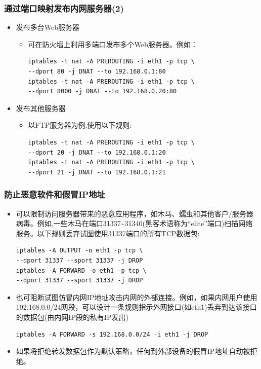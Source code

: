 \documentclass[xcolor=svgnames,presentation]{beamer}
\begin{document}
\begin{frame}[fragile]
\frametitle{通过端口映射发布内网服务器(2)}
\label{sec-3-9}
\begin{itemize}

\item 发布多台Web服务器
\label{sec-3-9-1}%
\begin{itemize}

\item 可在防火墙上利用多端口发布多个Web服务器。例如：\\
\label{sec-3-9-1-1}%
\begin{verbatim}
iptables -t nat -A PREROUTING -i eth1 -p tcp \
--dport 80 -j DNAT --to 192.168.0.1:80
iptables -t nat -A PREROUTING -i eth1 -p tcp \
--dport 8000 -j DNAT --to 192.168.0.20:80
\end{verbatim}
\end{itemize} %

\item 发布其他服务器
\label{sec-3-9-2}%
\begin{itemize}

\item 以FTP服务器为例,使用以下规则:\\
\label{sec-3-9-2-1}%
\begin{verbatim}
iptables -t nat -A PREROUTING -i eth1 -p tcp \
--dport 20 -j DNAT --to 192.168.0.1:20
iptables -t nat -A PREROUTING -i eth1 -p tcp \
--dport 21 -j DNAT --to 192.168.0.1:21
\end{verbatim}
\end{itemize} %
\end{itemize} %
\end{frame}
\begin{frame}[fragile]
\frametitle{防止恶意软件和假冒IP地址}
\label{sec-3-10}
\begin{itemize}

\item 可以限制访问服务器带来的恶意应用程序，如木马、蠕虫和其他客户/服务器病毒。例如,一些木马在端口31337\~{}31340(黑客术语称为“elite”端口)扫描网络服务。以下规则丢弃试图使用31337端口的所有TCP数据包:\\
\label{sec-3-10-1}%
\begin{verbatim}
iptables -A OUTPUT -o eth1 -p tcp \
--dport 31337 --sport 31337 -j DROP
iptables -A FORWARD -o eth1 -p tcp \
--dport 31337 --sport 31337 -j DROP
\end{verbatim}

\item 也可阻断试图仿冒内网IP地址攻击内网的外部连接。例如，如果内网用户使用192.168.0.0/24网段，可以设计一条规则指示外网接口(如eth1)丢弃到达该接口的数据包(由内网IP段的私有IP发出)\\
\label{sec-3-10-2}%
\begin{verbatim}
iptables -A FORWARD -s 192.168.0.0/24 -i eth1 -j DROP
\end{verbatim}

\item 如果将拒绝转发数据包作为默认策略，任何到外部设备的假冒IP地址自动被拒绝。
\label{sec-3-10-3}%
\end{itemize} %
\end{frame}
\end{document}

